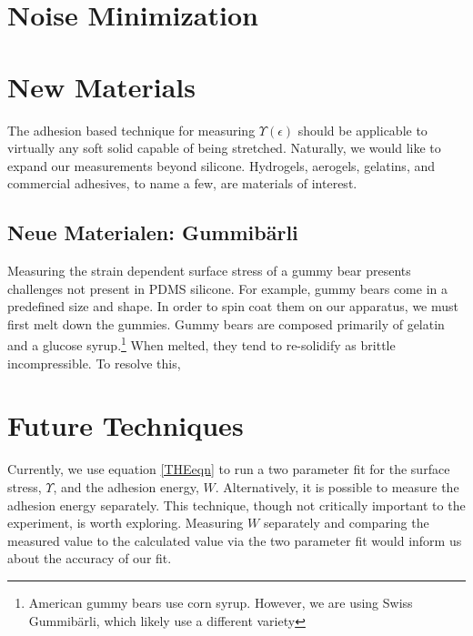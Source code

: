 \section{Noise Minimization}

\section{New Materials}
The adhesion based technique for measuring $\Upsilon(\epsilon)$ should be applicable to virtually any soft solid capable of being stretched. Naturally, we would like to expand our measurements beyond silicone. Hydrogels, aerogels, gelatins, and commercial adhesives, to name a few, are materials of interest. 
\subsection{Neue Materialen: Gummibärli}
Measuring the strain dependent surface stress of a gummy bear presents challenges not present in PDMS silicone. For example, gummy bears come in a predefined size and shape. In order to spin coat them on our apparatus, we must first melt down the gummies. Gummy bears are composed primarily of gelatin and a glucose syrup.\footnote{American gummy bears use corn syrup. However, we are using Swiss  Gummibärli, which likely use a different variety}  When melted, they tend to re-solidify as brittle incompressible. To resolve this, 
  
\section{Future Techniques}
Currently, we use equation \ref{THEeqn} to run a two parameter fit for the surface stress, $ \Upsilon $, and the adhesion energy, $ W $. Alternatively, it is possible to measure the adhesion energy separately. This technique, though not critically important to the experiment, is worth exploring. Measuring $ W $ separately and comparing the measured value to the calculated value via the two parameter fit would inform us about the accuracy of our fit.  

